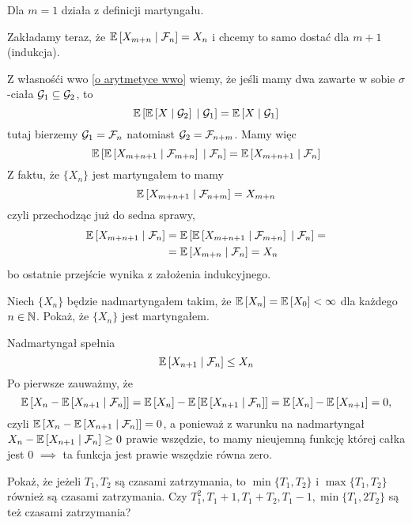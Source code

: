 \begin{solution}
  Dla $m=1$ działa z definicji martyngału.

  Zakładamy teraz, że $\expected{X_{m+n}}{\set{F}_n}=X_n$ i chcemy to samo dostać dla $m+1$ (indukcja).

  Z własnośći wwo \ref{o arytmetyce wwo} wiemy, że jeśli mamy dwa zawarte w sobie $\sigma$-ciała $\mathcal{G}_1\subseteq\mathcal{G}_2$, to
  $$\expected{\expected{X}{\set{G}_2}}{\set{G}_1}=\expected{X}{\set{G}_1}$$
  tutaj bierzemy $\mathcal{G}_1=\mathcal{F}_n$ natomiast $\mathcal{G}_2=\mathcal{F}_{n+m}$. Mamy więc
  $$\expected{\expected{X_{m+n+1}}{\set{F}_{m+n}}}{\set{F}_n}=\expected{X_{m+n+1}}{\set{F}_n}$$
  Z faktu, że $\{X_n\}$ jest martyngałem to mamy
  $$\expected{X_{m+n+1}}{\set{F}_{n+m}}=X_{m+n}$$
  czyli przechodząc już do sedna sprawy,
  \begin{align*}
    \expected{X_{m+n+1}}{\set{F}_n}&=\expected{\expected{X_{m+n+1}}{\set{F}_{m+n}}}{\set{F}_n}=\\ 
                                   &=\expected{X_{m+n}}{\set{F}_n}=X_n
  \end{align*}
  bo ostatnie przejście wynika z założenia indukcyjnego.
\end{solution}

\begin{problem}
  Niech $\{X_n\}$ będzie nadmartyngałem takim, że $\expected{X_n}=\expected{X_0}<\infty$ dla każdego $n\in\operatorname{\mathbb{N}}$. Pokaż, że $\{X_n\}$ jest martyngałem.
\end{problem}

\begin{solution}
  Nadmartyngał spełnia
  $$\expected{X_{n+1}}{\set{F}_n}\leq X_n$$
  Po pierwsze zauważmy, że
  $$\expected{X_n-\expected{X_{n+1}}{\set{F}_n}}=\expected{X_n}-\expected{\expected{X_{n+1}}{\set{F}_n}}=\expected{X_n}-\expected{X_{n+1}}=0,$$
  czyli $\expected{X_n-\expected{X_{n+1}}{\set{F}_n}}=0$, a ponieważ z warunku na nadmartyngał $X_n-\expected{X_{n+1}}{\set{F}_n}\geq0$ prawie wszędzie, to mamy nieujemną funkcję której całka jest $0$ $\implies$ ta funkcja jest prawie wszędzie równa zero.
\end{solution}

\begin{problem}
  Pokaż, że jeżeli $T_1,T_2$ są czasami zatrzymania, to $\min\{T_1,T_2\}$ i $\max\{T_1,T_2\}$ również są czasami zatrzymania. Czy $T_1^2, T_1+1,T_1+T_2, T_1-1, \min\{T_1,2T_2\}$ są też czasami zatrzymania?
\end{problem}

